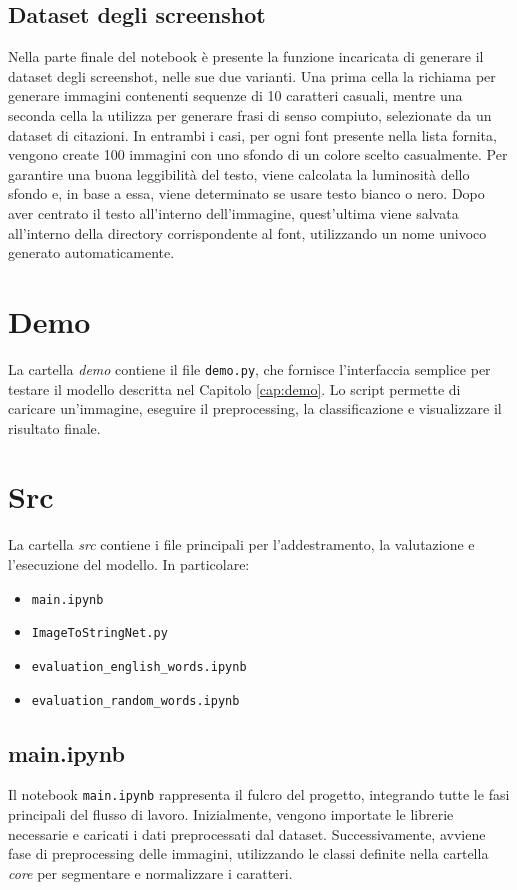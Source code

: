\subsection{Dataset degli screenshot}
Nella parte finale del notebook è presente la funzione incaricata di generare il dataset degli screenshot, nelle sue due varianti. Una prima cella la richiama per generare immagini contenenti sequenze di 10 caratteri casuali, mentre una seconda cella la utilizza per generare frasi di senso compiuto, selezionate da un dataset di citazioni. In entrambi i casi, per ogni font presente nella lista fornita, vengono create 100 immagini con uno sfondo di un colore scelto casualmente. Per garantire una buona leggibilità del testo, viene calcolata la luminosità dello sfondo e, in base a essa, viene determinato se usare testo bianco o nero. Dopo aver centrato il testo all’interno dell’immagine, quest’ultima viene salvata all’interno della directory corrispondente al font, utilizzando un nome univoco generato automaticamente.
\section{Demo}
La cartella \emph{demo} contiene il file \texttt{demo.py}, che fornisce l'interfaccia semplice per testare il modello descritta nel Capitolo \ref{cap:demo}. Lo script permette di caricare un'immagine, eseguire il preprocessing, la classificazione e visualizzare il risultato finale.

\section{Src}
La cartella \emph{src} contiene i file principali per l'addestramento, la valutazione e l'esecuzione del modello. In particolare:
\begin{itemize}
    \item \texttt{main.ipynb}
    \item \texttt{ImageToStringNet.py}
    \item \texttt{evaluation\_english\_words.ipynb}
    \item \texttt{evaluation\_random\_words.ipynb}
\end{itemize}

\subsection{main.ipynb}
Il notebook \texttt{main.ipynb} rappresenta il fulcro del progetto, integrando tutte le fasi principali del flusso di lavoro. Inizialmente, vengono importate le librerie necessarie e caricati i dati preprocessati dal dataset. Successivamente, avviene fase di preprocessing delle immagini, utilizzando le classi definite nella cartella \emph{core} per segmentare e normalizzare i caratteri. 

